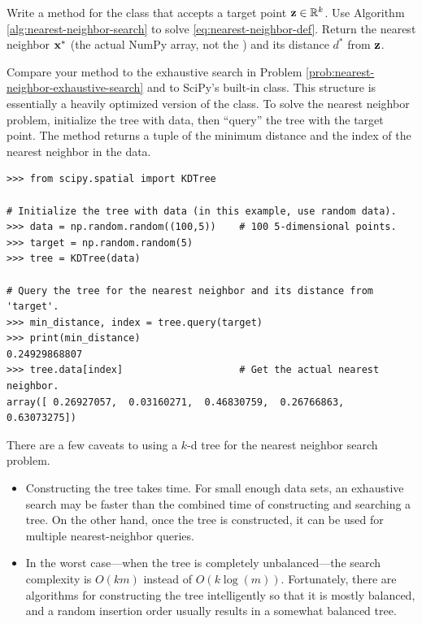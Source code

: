 \begin{problem} %
\label{prob:kdtree-nearest-neighbor-search}
Write a method for the  class that accepts a target point $\mathbf{z}\in\mathbb{R}^k$.
Use Algorithm \ref{alg:nearest-neighbor-search} to solve \eqref{eq:nearest-neighbor-def}.
Return the nearest neighbor $\mathbf{x}^*$ (the actual NumPy array, not the ) and its distance $d^*$ from $\mathbf{z}$.

Compare your method to the exhaustive search in Problem \ref{prob:nearest-neighbor-exhaustive-search} and to SciPy's built-in  class.
This structure is essentially a heavily optimized version of the  class.
To solve the nearest neighbor problem, initialize the tree with data, then ``query'' the tree with the target point.
The  method returns a tuple of the minimum distance and the index of the nearest neighbor in the data.

\begin{lstlisting}
>>> from scipy.spatial import KDTree

# Initialize the tree with data (in this example, use random data).
>>> data = np.random.random((100,5))    # 100 5-dimensional points.
>>> target = np.random.random(5)
>>> tree = KDTree(data)

# Query the tree for the nearest neighbor and its distance from 'target'.
>>> min_distance, index = tree.query(target)
>>> print(min_distance)
0.24929868807
>>> tree.data[index]                    # Get the actual nearest neighbor.
array([ 0.26927057,  0.03160271,  0.46830759,  0.26766863,  0.63073275])
\end{lstlisting}
\end{problem}

\begin{warn}
There are a few caveats to using a $k$-d tree for the nearest neighbor search problem.
\begin{itemize}
\item Constructing the tree takes time.
For small enough data sets, an exhaustive search may be faster than the combined time of constructing and searching a tree.
On the other hand, once the tree is constructed, it can be used for multiple nearest-neighbor queries.
\item In the worst case---when the tree is completely unbalanced---the search complexity is $O(km)$ instead of $O(k\log(m))$.
Fortunately, there are algorithms for constructing the tree intelligently so that it is mostly balanced, and a random insertion order usually results in a somewhat balanced tree.
\end{itemize}
\end{warn}

